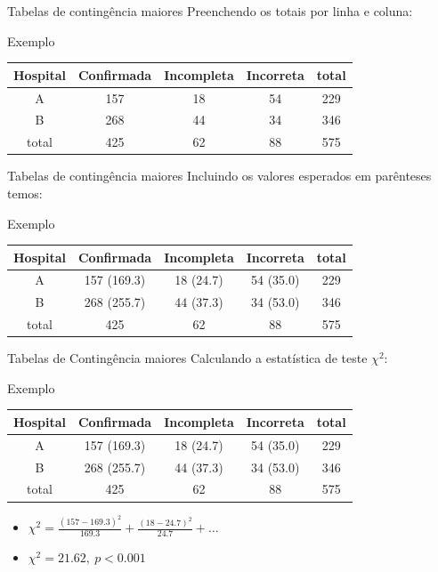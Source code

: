 \documentclass{beamer}
\begin{document}
\begin{frame}{\scriptsize Tabelas de contingência maiores}
  Preenchendo os totais por linha e coluna:
  \begin{exampleblock}{Exemplo}
    \footnotesize
    \begin{tabular}{c|c|c|c|c}
      Hospital & Confirmada & Incompleta &
      Incorreta & total\\
      \hline
      A & 157 & 18 & 54 & 229\\
      \hline
      B & 268 & 44 & 34 & 346\\
      \hline
      total & 425 & 62 & 88 & 575\\
    \end{tabular}
  \end{exampleblock}
\end{frame}

\begin{frame}{\scriptsize Tabelas de contingência maiores}
  Incluindo os valores esperados em parênteses temos:
  \begin{exampleblock}{Exemplo}
    \footnotesize
    \begin{tabular}{c|c|c|c|c}
      Hospital & Confirmada & Incompleta &
      Incorreta & total\\
      \hline
      A & 157 (169.3) & 18 (24.7) & 54 (35.0) & 229\\
      \hline
      B & 268 (255.7) & 44 (37.3) & 34 (53.0) & 346\\
      \hline
      total & 425 & 62 & 88 & 575\\
    \end{tabular}
  \end{exampleblock}
\end{frame}

\begin{frame}{\scriptsize Tabelas de Contingência maiores}
  \small
  Calculando a estatística de teste $\chi^2$:

  \bigskip
  \begin{exampleblock}{Exemplo}
    \footnotesize
    \begin{tabular}{c|c|c|c|c}
      \footnotesize
      Hospital & Confirmada & Incompleta &
      Incorreta & total\\
      \hline
      A & 157 (169.3) & 18 (24.7) & 54 (35.0) & 229\\
      \hline
      B & 268 (255.7) & 44 (37.3) & 34 (53.0) & 346\\
      \hline
      total & 425 & 62 & 88 & 575\\
    \end{tabular}
  \end{exampleblock}
  \begin{itemize}
    \scriptsize
  \item $\chi^2 = \frac{(157 - 169.3)^2}{169.3} + \frac{(18-24.7)^2}{24.7}  + \ldots$
    \bigskip
    \small
  \item $\chi^2 = 21.62,\ p<0.001$
  \end{itemize}
\end{frame}
\end{document}
